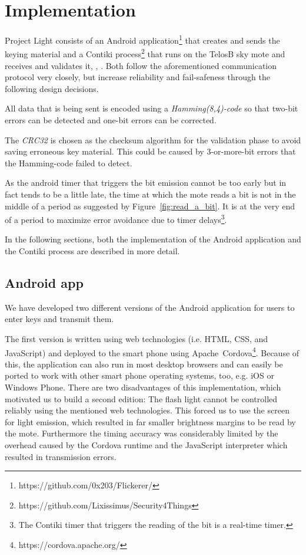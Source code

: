 \documentclass{sig-alternate} %
\begin{document}
\section{Implementation}
\label{sec:implementation}

Project Light consists of an Android application\footnote{https://github.com/0x203/Flickerer/} that creates and sends the keying material and a Contiki process\footnote{https://github.com/Lixissimus/Security4Things} that runs on the TelosB sky mote and receives and validates it, \cite{dunkels04contiki}, \cite{telosb}.
Both follow the aforementioned communication protocol very closely, but increase reliability and fail-safeness through the following design decisions.

All data that is being sent is encoded using a \textit{Hamming(8,4)-code} so that two-bit errors can be detected and one-bit errors can be corrected.

The \textit{CRC32} is chosen as the checksum algorithm for the validation phase to avoid saving erroneous key material.
This could be caused by 3-or-more-bit errors that the Hamming-code failed to detect.

As the android timer that triggers the bit emission cannot be too early but in fact tends to be a little late\cite{mongia2010reliable}, the time at which the mote reads a bit is not in the middle of a period as suggested by Figure~\ref{fig:read_a_bit}.
It is at the very end of a period to maximize error avoidance due to timer delays\footnote{The Contiki timer that triggers the reading of the bit is a real-time timer.}.

In the following sections, both the implementation of the Android application and the Contiki process are described in more detail.

\subsection{Android app}
\label{sub:android_app}

We have developed two different versions of the Android application for users to enter keys and transmit them.

The first version is written using web technologies (i.e. HTML, CSS, and JavaScript) and deployed to the smart phone using Apache~Cordova\footnote{https://cordova.apache.org/}.
Because of this, the application can also run in most desktop browsers and can easily be ported to work with other smart phone operating systems, too, e.g. iOS or Windows Phone.
There are two disadvantages of this implementation, which motivated us to build a second edition:
The flash light cannot be controlled reliably using the mentioned web technologies.
This forced us to use the screen for light emission, which resulted in far smaller brightness margins to be read by the mote.
Furthermore the timing accuracy was considerably limited by the overhead caused by the Cordova runtime and the JavaScript interpreter which resulted in transmission errors.
\end{document}
